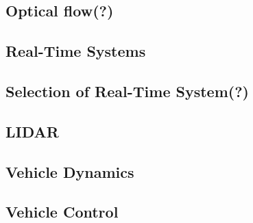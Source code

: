 \subsection{Optical flow(?)}

\subsection{Real-Time Systems}

\subsection{Selection of Real-Time System(?)}

\subsection{LIDAR}

\subsection{Vehicle Dynamics}

\subsection{Vehicle Control}

